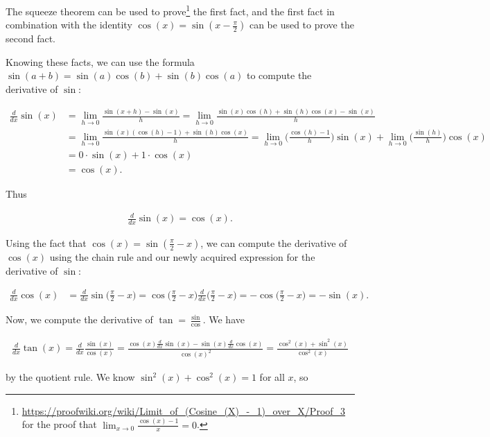 The squeeze theorem can be used to prove\footnote{\url{https://proofwiki.org/wiki/Limit_of_(Cosine_(X)_-_1)_over_X/Proof_3} for the proof that $\lim_{x \rightarrow 0} \frac{\cos(x) - 1}{x} = 0$.} the first fact, and the first fact in combination with the identity $\cos(x) = \sin(x - \frac{\pi}{2})$ can be used to prove the second fact. 

Knowing these facts, we can use the formula $\sin(a + b) = \sin(a)\cos(b) + \sin(b)\cos(a)$ to compute the derivative of $\sin$:

\begin{align*}
    \frac{d}{dx}\sin(x)
    &= \lim_{h \rightarrow 0} \frac{\sin(x + h) - \sin(x)}{h}
    = \lim_{h \rightarrow 0} \frac{\sin(x)\cos(h) + \sin(h)\cos(x) - \sin(x)}{h} \\
    &= \lim_{h \rightarrow 0} \frac{\sin(x)(\cos(h) - 1) + \sin(h)\cos(x)}{h} 
    = \lim_{h \rightarrow 0}\Big( \frac{\cos(h) - 1}{h} \Big) \sin(x) + \lim_{h \rightarrow 0}\Big( \frac{\sin(h)}{h} \Big) \cos(x) \\
    &= 0 \cdot \sin(x) + 1 \cdot \cos(x) \\
    &= \cos(x).
\end{align*}

Thus 

\begin{align*}
    \frac{d}{dx} \sin(x) = \cos(x).
\end{align*}

Using the fact that $\cos(x) = \sin(\frac{\pi}{2} - x)$, we can compute the derivative of $\cos(x)$ using the chain rule and our newly acquired expression for the derivative of $\sin$:

\begin{align*}
    \frac{d}{dx} \cos(x) 
    &= \frac{d}{dx} \sin\Big(\frac{\pi}{2} - x\Big) 
    = \cos\Big(\frac{\pi}{2} - x\Big) \frac{d}{dx}\Big(\frac{\pi}{2} - x\Big)
    = -\cos\Big(\frac{\pi}{2} - x\Big) = -\sin(x). 
\end{align*}

Now, we compute the derivative of $\tan = \frac{\sin}{\cos}$. We have

\begin{align*}
    \frac{d}{dx} \tan(x)
    = \frac{d}{dx} \frac{\sin(x)}{\cos(x)} 
    = \frac{\cos(x) \frac{d}{dx} \sin(x) - \sin(x) \frac{d}{dx} \cos(x)}{\cos(x)^2} = \frac{\cos^2(x) + \sin^2(x)}{\cos^2(x)}
\end{align*}

by the quotient rule. We know $\sin^2(x) + \cos^2(x) = 1$ for all $x$, so

